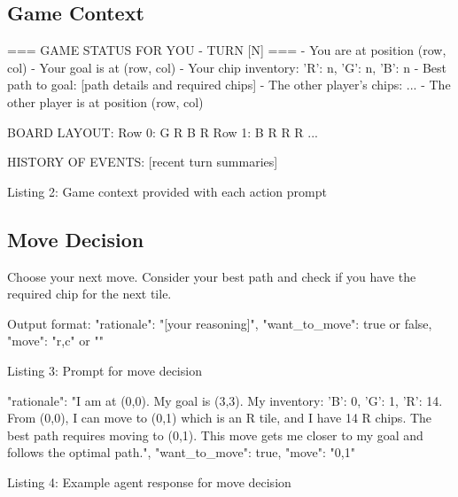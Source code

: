 \documentclass{article} %
\begin{document}
\subsection{Game Context}

\begin{promptbox}
=== GAME STATUS FOR YOU - TURN [N] ===
- You are at position (row, col)
- Your goal is at (row, col)
- Your chip inventory: {'R': n, 'G': n, 'B': n}
- Best path to goal: [path details and required chips]
- The other player's chips: {...}
- The other player is at position (row, col)

BOARD LAYOUT:
Row 0: G R B R
Row 1: B R R R
...

HISTORY OF EVENTS:
[recent turn summaries]
\end{promptbox}
\vspace{-8pt}
\begin{center}\small Listing 2: Game context provided with each action prompt\end{center}

\subsection{Move Decision}

\begin{promptbox}

Choose your next move. Consider your best path and check if you have the required chip for the next tile.

Output format:
{
  "rationale": "[your reasoning]",
  "want_to_move": true or false,
  "move": "r,c" or ""
}
\end{promptbox}
\vspace{-8pt}
\begin{center}\small Listing 3: Prompt for move decision\end{center}

\begin{promptbox}
{
  "rationale": "I am at (0,0). My goal is (3,3). My inventory:
  {'B': 0, 'G': 1, 'R': 14}. From (0,0), I can move to (0,1)
  which is an R tile, and I have 14 R chips. The best path
  requires moving to (0,1). This move gets me closer to my
  goal and follows the optimal path.",
  "want_to_move": true,
  "move": "0,1"
}
\end{promptbox}
\vspace{-8pt}
\begin{center}\small Listing 4: Example agent response for move decision\end{center}
\end{document}
